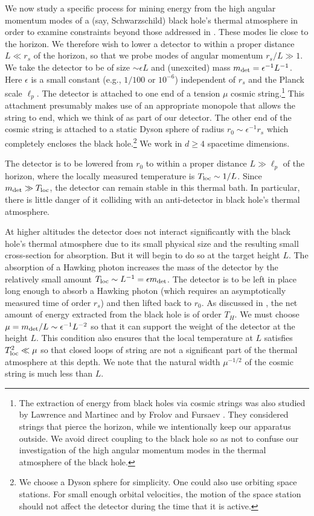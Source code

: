 \documentclass[12pt]{article}
\begin{document}
We now study a specific process for mining energy from the high angular momentum modes of a (say, Schwarzschild) black hole's thermal atmosphere in order to examine constraints beyond those addressed in \cite{Unruh:1982ic}.  These modes lie close to the horizon.  We therefore wish to lower a detector to within a proper distance $L \ll r_s$ of the horizon, so that we probe modes of angular momentum $r_s/L \gg 1$. We take the detector to be of size $\sim \epsilon L$ and (unexcited) mass $m_{\rm det} = \epsilon^{-1} L^{-1}$. Here $\epsilon$ is a small constant (e.g., $1/100$ or $10^{-6}$) independent of $r_s$ and the Planck scale $\ell_p$.  The detector is attached to one end of a tension $\mu$ cosmic string.\footnote{The extraction of energy from black holes via cosmic strings was also studied by Lawrence and Martinec \cite{LM} and by Frolov and Fursaev \cite{FF}.  They considered strings that pierce the horizon, while we intentionally keep our apparatus outside.  We avoid direct coupling to the black hole so as not to confuse our investigation of the high angular momentum modes in the thermal atmosphere of the black hole.}   This attachment presumably makes use of an appropriate monopole that allows the string to end, which we think of as part of our detector.  The other end of the cosmic string is attached to a static Dyson sphere of radius $r_0 \sim \epsilon^{-1} r_s$ which completely encloses the black hole.\footnote{We choose a Dyson sphere for simplicity.  One could also use orbiting space stations.  For small enough orbital velocities, the motion of the space station should not affect the detector during the time that it is active.}  We work in $d \ge 4$ spacetime dimensions.


The detector is to be lowered from $r_0$ to within a proper distance $L \gg \ell_p$ of the horizon, where the locally measured temperature is $T_{\rm loc} \sim 1/L$.   Since  $m_{\rm det} \gg T_{\rm loc}$, the detector can remain stable in this thermal bath.  In particular, there is little danger of it colliding with an anti-detector in black hole's thermal atmosphere.

At higher altitudes the detector does not interact significantly with the black hole's thermal atmosphere due to its small physical size and the resulting small cross-section for absorption.  But it will begin to do so at the target height $L$.  The absorption of a Hawking photon increases the mass of the detector by  the relatively small amount $T_{\rm loc} \sim L^{-1} = \epsilon m_{\rm det}$.  The detector is to be left in place long enough to absorb a Hawking photon (which requires an asymptotically measured time of order $r_s$) and then lifted back to $r_0$.  As discussed in \cite{Unruh:1982ic}, the net amount of energy extracted from the black hole is of order $T_H$.  We must choose $\mu =
m_{\rm det}/L \sim \epsilon^{-1} L^{-2}$ so that it can support the weight of the detector at the height $L$.    This condition also ensures that the local temperature at $L$ satisfies $T_{\rm loc}^2 \ll \mu$ so that closed loops of string are not a significant part of the thermal atmosphere at this depth.  We note that the natural width $\mu^{-1/2}$ of the cosmic string is much less than $L$.
\end{document}
